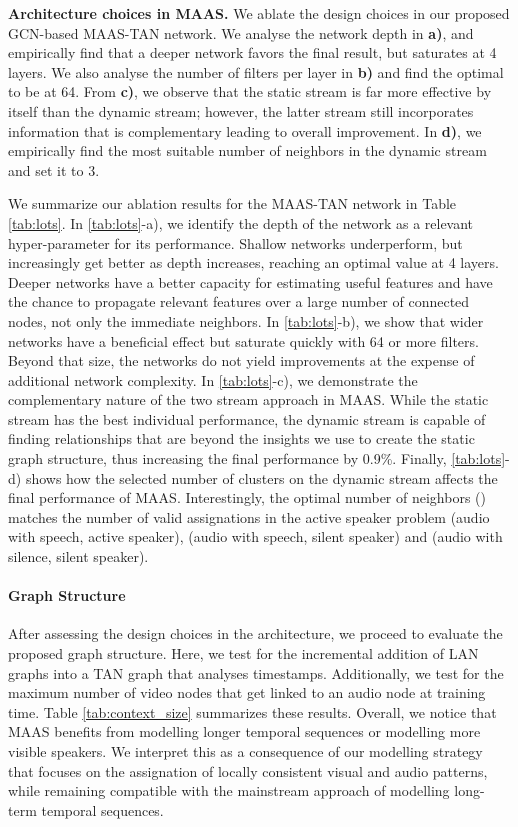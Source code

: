 \documentclass[10pt,twocolumn,letterpaper]{article}
\begin{document}
\begin{table*}[t]
\caption{\textbf{Architecture choices in MAAS.} We ablate the design choices in our proposed GCN-based MAAS-TAN network. We analyse the network depth in \textbf{a)}, and empirically find that a deeper network favors the final result, but saturates at 4 layers. We also analyse the number of filters per layer in \textbf{b)} and find the optimal to be at 64. From \textbf{c)}, we observe that the static stream is far more effective by itself than the dynamic stream; however, the latter stream still incorporates information that is complementary leading to overall improvement. In \textbf{d)}, we empirically find the most suitable number of neighbors in the dynamic stream and set it to 3.}
    
\label{tab:lots}
 \vspace{-0.25cm}
\end{table*} 

We summarize our ablation results for the MAAS-TAN network in Table \ref{tab:lots}. In \ref{tab:lots}-a), we identify the depth of the network as a relevant hyper-parameter for its performance. Shallow networks underperform, but increasingly get better as depth increases, reaching an optimal value at 4 layers. Deeper networks have a better capacity for estimating useful features and have the chance to propagate relevant features over a large number of connected nodes, not only the immediate neighbors. In \ref{tab:lots}-b), we show that wider networks have a beneficial effect but saturate quickly with 64 or more filters. Beyond that size, the networks do not yield improvements at the expense of additional network complexity. In \ref{tab:lots}-c), we demonstrate the complementary nature of the two stream approach in MAAS. While the static stream has the best individual performance, the dynamic stream is capable of finding relationships that are beyond the insights we use to create the static graph structure, thus increasing the final performance by 0.9\%. Finally, \ref{tab:lots}-d) shows how the selected number of clusters on the dynamic stream affects the final performance of MAAS. Interestingly, the optimal number of neighbors () matches the number of valid assignations in the active speaker problem (audio with speech, active speaker), (audio with speech, silent speaker) and (audio with silence, silent speaker). 


\paragraph{Graph Structure} After assessing the design choices in the architecture, we proceed to evaluate the proposed graph structure. Here, we test for the incremental addition of LAN graphs into a TAN graph that analyses  timestamps. Additionally, we test for the maximum number of video nodes that get linked to an audio node at training time. Table \ref{tab:context_size} summarizes these results. Overall, we notice that MAAS benefits from  modelling longer temporal sequences or modelling more visible speakers. We interpret this as a consequence of our modelling strategy that focuses on the assignation of locally consistent visual and audio patterns, while remaining compatible with the mainstream approach of modelling long-term temporal sequences.
\end{document}
